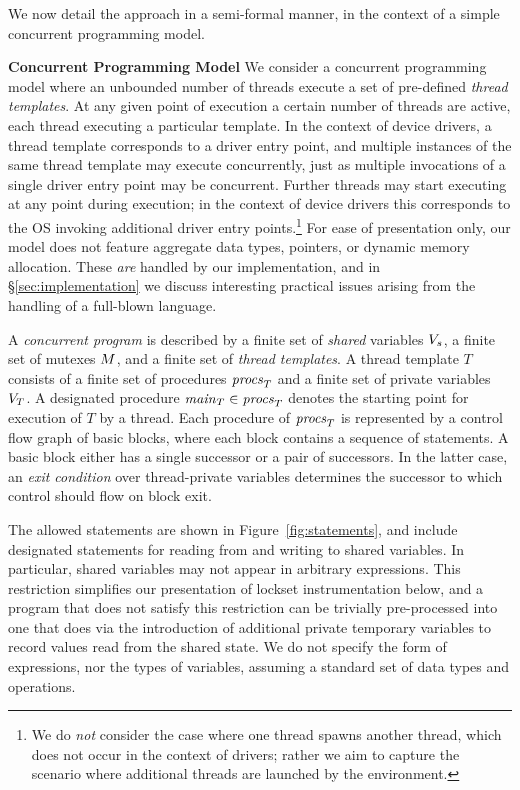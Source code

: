 We now detail the approach in a semi-formal manner, in the context of a simple concurrent programming model.

\noindent\textbf{Concurrent Programming Model }
%
We consider a concurrent programming model where an unbounded number of threads execute a set of pre-defined \emph{thread templates}.  At any given point of execution a certain number of threads are active, each thread executing a particular template.  In the context of device drivers, a thread template corresponds to a driver entry point, and multiple instances of the same thread template may execute concurrently, just as multiple invocations of a single driver entry point may be concurrent.  Further threads may start executing at any point during execution; in the context of device drivers this corresponds to the OS invoking additional driver entry points.\footnote{We do \emph{not} consider the case where one thread spawns another thread, which does not occur in the context of drivers; rather we aim to capture the scenario where additional threads are launched by the environment.}  For ease of presentation only, our model does not feature aggregate data types, pointers, or dynamic memory allocation.  These \emph{are} handled by our implementation, and in \S\ref{sec:implementation} we discuss interesting practical issues arising from the handling of a full-blown language.

A \emph{concurrent program} is described by a finite set of \emph{shared} variables $V_s$, a finite set of mutexes $M$, and a finite set of \emph{thread templates}.  A thread template $T$ consists of a finite set of procedures $\mathit{procs}_{T}$ and a finite set of private variables $V_{T}$.  A designated procedure $\mathit{main}_{T} \in \mathit{procs}_{T}$ denotes the starting point for execution of $T$ by a thread.  Each procedure of $\mathit{procs}_{T}$ is represented by a control flow graph of basic blocks, where each block contains a sequence of statements.  A basic block either has a single successor or a pair of successors.  In the latter case, an \emph{exit condition} over thread-private variables determines the successor to which control should flow on block exit.

The allowed statements are shown in Figure~\ref{fig:statements}, and include designated statements for reading from and writing to shared variables.  In particular, shared variables may not appear in arbitrary expressions.  This restriction simplifies our presentation of lockset instrumentation below, and a program that does not satisfy this restriction can be trivially pre-processed into one that does via the introduction of additional private temporary variables to record values read from the shared state.  We do not specify the form of expressions, nor the types of variables, assuming a standard set of data types and operations.

